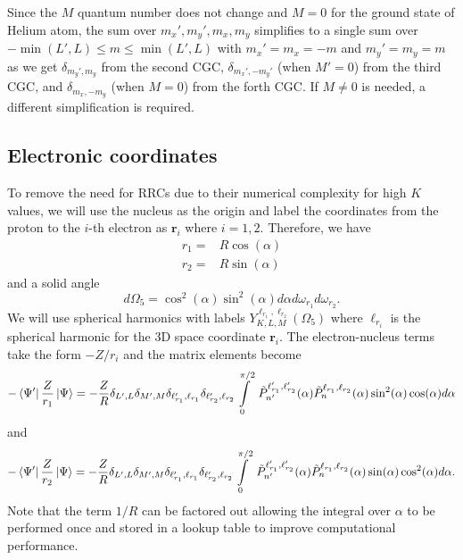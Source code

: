 Since the $M$ quantum number does not change and $M=0$ for the ground state of Helium atom, the sum over $m_x',m_y',m_x,m_y$ simplifies to a single sum over $-\min(L',L)\le m \le \min(L',L)$ with $m_x'=m_x=-m$ and $m_y'=m_y=m$ as we get $\delta_{m_y',m_y}$ from the second CGC, $\delta_{m_x',-m_y'}$ (when $M'=0$) from the third CGC, and $\delta_{m_x,-m_y}$ (when $M=0$) from the forth CGC. If $M\ne0$ is needed, a different simplification is required.


\subsection{Electronic coordinates} %
\label{sub:electronic_coordinates}
To remove the need for RRCs due to their numerical complexity for high $K$ values, we will use the nucleus as the origin and label the coordinates from the proton to the $i$-th electron as $\mathbf{r}_i$ where $i=1,2$. Therefore, we have
\begin{align}
r_1 =& R \cos(\alpha)\\
r_2 =& R \sin(\alpha)
\end{align}
and a solid angle 
\begin{equation}
  d\Omega_5 = \cos^2(\alpha)  \sin^2(\alpha) d\alpha d\omega_{r_1} d\omega_{r_2}.
\end{equation}
We will use spherical harmonics with labels $Y_{K,L,M}^{\ell_{r_1},\ell_{r_2}}(\Omega_5)$ where $\ell_{r_i}$ is the spherical harmonic for the 3D space coordinate $\mathbf{r}_i$. The electron-nucleus terms take the form $-Z/r_i$ and the  matrix elements become
\begin{equation}
  -\bra{\Psi'}\frac{Z}{r_1}\ket{\Psi} = -\frac{Z}{R}\delta_{L',L}\delta_{M',M}\delta_{\ell_{r_1}',\ell_{r_1}}\delta_{\ell_{r_2}',\ell_{r_2}} \int\limits_0^{\pi/2}\ \tilde{P}^{\ell_{r_1}',\ell_{r_2}'}_{n'}(\alpha) \tilde{P}^{\ell_{r_1},\ell_{r_2}}_{n}(\alpha) \sin^2(\alpha) \cos(\alpha)d\alpha
\end{equation}
and 
\begin{equation}
  -\bra{\Psi'}\frac{Z}{r_2}\ket{\Psi} = -\frac{Z}{R}\delta_{L',L}\delta_{M',M}\delta_{\ell_{r_1}',\ell_{r_1}}\delta_{\ell_{r_2}',\ell_{r_2}} \int\limits_0^{\pi/2}\ \tilde{P}^{\ell_{r_1}',\ell_{r_2}'}_{n'}(\alpha) \tilde{P}^{\ell_{r_1},\ell_{r_2}}_{n}(\alpha) \sin(\alpha) \cos^2(\alpha)d\alpha.
\end{equation}
Note that the term $1/R$ can be factored out allowing the integral over $\alpha$ to be performed once and stored in a lookup table to improve computational performance.

